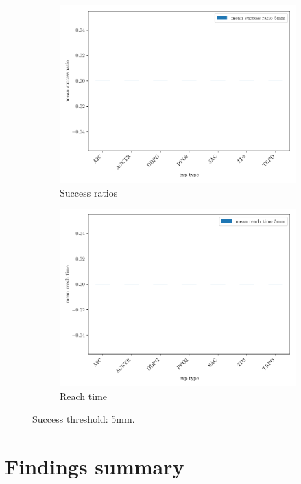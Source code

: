 \documentclass{article}
\begin{document}
\begin{figure}[H]
\centering
\begin{subfigure}{0.49\textwidth}
  \centering
  \includegraphics[width=\textwidth]{../success_5mm.pdf}
  \caption{Success ratios} 
\end{subfigure}
\begin{subfigure}{0.49\textwidth}
  \centering
  \includegraphics[width=\textwidth]{../reachtime_5mm.pdf} 
  \caption{Reach time}
\end{subfigure}
\caption{Success threshold: 5mm.}
\end{figure}




\section{Findings summary}
\end{document}
